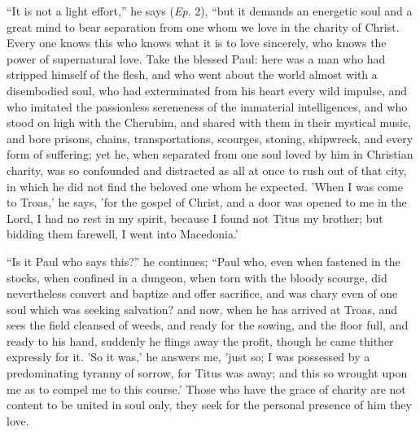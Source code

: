 ``It is not a light effort,'' he says (\emph{Ep}. 2),
``but it demands an energetic soul and a great mind to bear
separation from one whom we love in the charity of Christ. Every one
knows this who knows what it is to love sincerely, who knows the power
of supernatural love. Take the blessed Paul: here was a man who had
stripped himself of the flesh, and who went about the world almost
with a disembodied soul, who had exterminated from his heart every
wild impulse, and who imitated the passionless sereneness of the
immaterial intelligences, and who stood on high with the Cherubim, and
shared with them in their mystical music, and bore prisons, chains,
transportations, scourges, stoning, shipwreck, and every form of
suffering; yet he, when separated from one soul loved by him in
Christian charity, was so confounded and distracted as all at once to
rush out of that city, in which he did not find the beloved one whom
he expected. 'When I was come to Troas,' he says, 'for the gospel of
Christ, and a door was opened to me in the Lord, I had no rest in my
spirit, because I found not Titus my brother; but bidding them
farewell, I went into Macedonia.'

``Is it Paul who says this?'' he continues; ``Paul who,
even when fastened in the stocks, when confined in a dungeon, when
torn with the bloody scourge, did nevertheless convert and baptize and
offer sacrifice, and was chary even of one soul which was seeking
salvation? and now, when he has arrived at Troas, and sees the field
cleansed of weeds, and ready for the sowing, and the floor full, and
ready to his hand, suddenly he flings away the profit, though he came
thither expressly for it. 'So it was,' he answers me, 'just so; I was
possessed by a predominating tyranny of sorrow, for Titus was away;
and this so wrought upon me as to compel me to this course.' Those who
have the grace of charity are not content to be united in soul only,
they seek for the personal presence of him they love.

